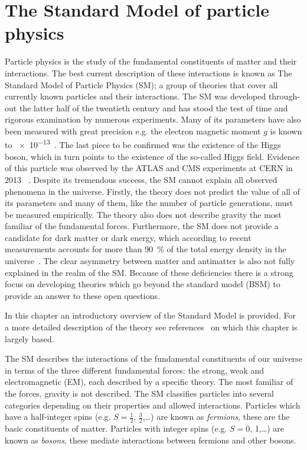 \newcommand\scalemath[2]{\scalebox{#1}{\mbox{\ensuremath{\displaystyle #2}}}}
\chapter{The Standard Model of particle physics}
\label{ch:Theory}

Particle physics is the study of the fundamental constituents of matter and their interactions. The best current description of these interactions is known as The Standard Model of Particle Physics (SM); a group of theories that cover all currently known particles and their interactions. The SM was developed through-out the latter half of the twentieth century and has stood the test of time and rigorous examination by numerous experiments. Many of its parameters have also been measured with great precision e.g. the electron magnetic moment $g$ is known to \num{e-13}~\cite{Theory:AwesomeSM}. The last piece to be confirmed was the existence of the Higgs boson, which in turn points to the existence of the so-called Higgs field. Evidence of this particle was observed by the ATLAS and CMS experiments at CERN in 2013~\cite{Theory:HiggsDiscoveryATLAS,Theory:HiggsDiscoveryCMS} .
Despite its tremendous success, the SM cannot explain all observed phenomena in the universe. Firstly, the theory does not predict the value of all of its parameters and many of them, like the number of particle generations, must be measured empirically. The theory also does not describe gravity the most familiar of the fundamental forces. Furthermore, the SM does not provide a candidate for dark matter or dark energy, which according to recent measurements accounts for more than \SI{90}{\percent} of the total energy density in the universe~\cite{Theory:DarkMatter}. The clear asymmetry between matter and antimatter is also not fully explained in the realm of the SM. Because of these deficiencies there is a strong focus on developing theories which go beyond the standard model (BSM) to provide an answer to these open questions.

In this chapter an introductory overview of the Standard Model is provided. For a more detailed description of the theory see references~\cite{Theory:Perkins,Theory:IntroGriffiths} on which this chapter is largely based.

The SM describes the interactions of the fundamental constituents of our universe in terms of the three different fundamental forces: the strong, weak and electromagnetic (EM), each described by a specific theory. The most familiar of the forces, gravity is not described. The SM classifies particles into several categories depending on their properties and allowed interactions. Particles which have a half-integer spins (e.g. $S=\frac{1}{2}$, $\frac{3}{2}$,\ldots) are known as \emph{fermions}, these are the basic constituents of matter. Particles with integer spins (e.g. $S=0$, 1,\ldots) are known as \emph{bosons}, these mediate interactions between fermions and other bosons.

